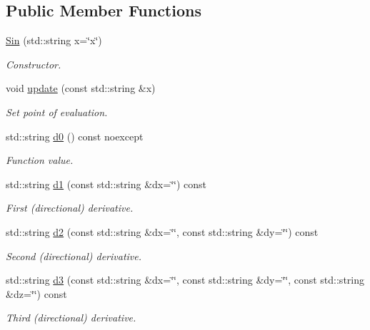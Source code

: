 \subsection*{Public Member Functions}
\begin{DoxyCompactItemize}
\item 
\hyperlink{structFunG_1_1texify_1_1Sin_a6001bbfd994aa2a10ec11cf2316c9717}{Sin} (std\-::string x=\char`\"{}x\char`\"{})
\begin{DoxyCompactList}\small\item\em Constructor. \end{DoxyCompactList}\item 
void \hyperlink{structFunG_1_1texify_1_1Sin_ab910ef2ca2b7e27978a4bac16128d703}{update} (const std\-::string \&x)
\begin{DoxyCompactList}\small\item\em Set point of evaluation. \end{DoxyCompactList}\item 
std\-::string \hyperlink{structFunG_1_1texify_1_1Sin_ae2cf01437da9124fc506435a7b88c454}{d0} () const noexcept
\begin{DoxyCompactList}\small\item\em Function value. \end{DoxyCompactList}\item 
std\-::string \hyperlink{structFunG_1_1texify_1_1Sin_abdf4a366a01083db5d3b00d72968932f}{d1} (const std\-::string \&dx=\char`\"{}\char`\"{}) const 
\begin{DoxyCompactList}\small\item\em First (directional) derivative. \end{DoxyCompactList}\item 
std\-::string \hyperlink{structFunG_1_1texify_1_1Sin_a48504a5be408b49e848d958b78f54e90}{d2} (const std\-::string \&dx=\char`\"{}\char`\"{}, const std\-::string \&dy=\char`\"{}\char`\"{}) const 
\begin{DoxyCompactList}\small\item\em Second (directional) derivative. \end{DoxyCompactList}\item 
std\-::string \hyperlink{structFunG_1_1texify_1_1Sin_ac51be9dc4b26ca1bf3df229d826e5ecc}{d3} (const std\-::string \&dx=\char`\"{}\char`\"{}, const std\-::string \&dy=\char`\"{}\char`\"{}, const std\-::string \&dz=\char`\"{}\char`\"{}) const 
\begin{DoxyCompactList}\small\item\em Third (directional) derivative. \end{DoxyCompactList}\end{DoxyCompactItemize}


